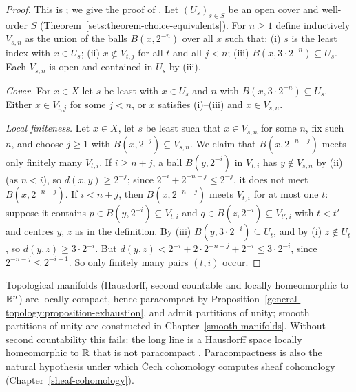 \begin{proof}
This is \cite{stone-1948}; we give the proof of \cite{rudin-paracompact}. Let $(U_s)_{s \in S}$ be an open cover and well-order $S$
(Theorem~\ref{sets:theorem-choice-equivalents}). For $n \geq 1$ define inductively $V_{s,n}$ as the union of the balls $B(x, 2^{-n})$ over all $x$ such
that: (i) $s$ is the least index with $x \in U_s$; (ii) $x \notin V_{t,j}$ for all $t$ and all $j < n$; (iii) $B(x, 3 \cdot 2^{-n}) \subseteq U_s$. Each
$V_{s,n}$ is open and contained in $U_s$ by (iii).

\emph{Cover.} For $x \in X$ let $s$ be least with $x \in U_s$ and $n$ with $B(x, 3 \cdot 2^{-n}) \subseteq U_s$. Either $x \in V_{t,j}$ for some $j < n$, or $x$
satisfies (i)--(iii) and $x \in V_{s,n}$.

\emph{Local finiteness.} Let $x \in X$, let $s$ be least such that $x \in V_{s,n}$ for some $n$, fix such $n$, and choose $j \geq 1$ with $B(x, 2^{-j}) \subseteq V_{s,n}$.
We claim that $B(x, 2^{-n-j})$ meets only finitely many $V_{t,i}$. If $i \geq n + j$, a ball $B(y, 2^{-i})$ in $V_{t,i}$ has $y \notin V_{s,n}$ by (ii) (as
$n < i$), so $d(x, y) \geq 2^{-j}$; since $2^{-i} + 2^{-n-j} \leq 2^{-j}$, it does not meet $B(x, 2^{-n-j})$. If $i < n + j$, then $B(x, 2^{-n-j})$ meets
$V_{t,i}$ for at most one $t$: suppose it contains $p \in B(y, 2^{-i}) \subseteq V_{t,i}$ and $q \in B(z, 2^{-i}) \subseteq V_{t',i}$ with $t < t'$ and centres $y$, $z$
as in the definition. By (iii) $B(y, 3 \cdot 2^{-i}) \subseteq U_t$, and by (i) $z \notin U_t$, so $d(y, z) \geq 3 \cdot 2^{-i}$. But
$d(y, z) < 2^{-i} + 2 \cdot 2^{-n-j} + 2^{-i} \leq 3 \cdot 2^{-i}$, since $2^{-n-j} \leq 2^{-i-1}$. So only finitely many pairs $(t, i)$ occur.
\end{proof}

\begin{remark}\label{general-topology:remark-paracompact}
Topological manifolds (Hausdorff, second countable and locally homeomorphic to $\mathbb{R}^n$) are locally compact, hence paracompact by
Proposition~\ref{general-topology:proposition-exhaustion}, and admit partitions of unity; smooth partitions of unity are constructed in
Chapter~\ref{smooth-manifolds}. Without second countability this fails: the long line is a Hausdorff space locally homeomorphic to $\mathbb{R}$ that is not
paracompact \cite{engelking-general-topology}. Paracompactness is also the natural hypothesis under which \v{C}ech cohomology computes sheaf
cohomology (Chapter~\ref{sheaf-cohomology}).
\end{remark}

